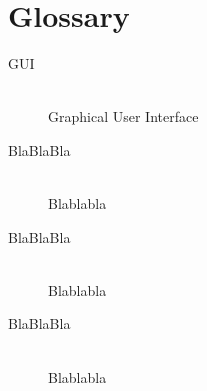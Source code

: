 \newpage
\section{Glossary}

\begin{description}
\item[GUI]\hfill \\ Graphical User Interface
\item[BlaBlaBla]\hfill \\ Blablabla
\item[BlaBlaBla]\hfill \\ Blablabla
\item[BlaBlaBla]\hfill \\ Blablabla
\end{description}